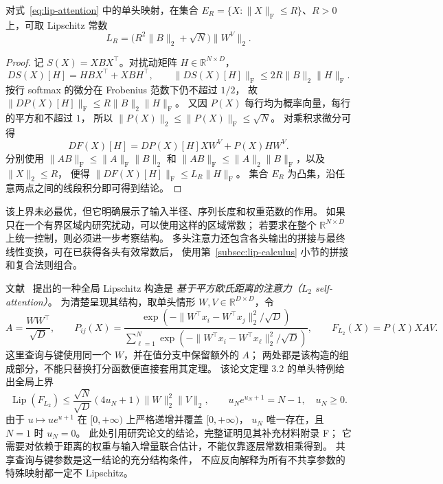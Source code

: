 \documentclass[UTF8,12pt,a4paper,fontset=fandol]{ctexart}
\begin{document}
\begin{proposition}\label{prop:lip-attention-bounded}
对式~\eqref{eq:lip-attention} 中的单头映射，在集合
$E_R=\{X:\|X\|_{\mathrm F}\le R\}$、$R>0$ 上，可取 Lipschitz 常数
\begin{equation}\label{eq:lip-attention-bounded}
  L_R=\bigl(R^2\|B\|_2+\sqrt N\bigr)\|W^V\|_2.
\end{equation}
\end{proposition}
\begin{proof}
记 $S(X)=XBX^\top$。对扰动矩阵 $H\in\mathbb R^{N\times D}$，
\[
  DS(X)[H]=HBX^\top+XBH^\top,\qquad
  \|DS(X)[H]\|_{\mathrm F}\le2R\|B\|_2\|H\|_{\mathrm F}.
\]
按行 softmax 的微分在 Frobenius 范数下仍不超过 $1/2$，
故 $\|DP(X)[H]\|_{\mathrm F}\le R\|B\|_2\|H\|_{\mathrm F}$。
又因 $P(X)$ 每行均为概率向量，每行的平方和不超过 $1$，
所以 $\|P(X)\|_2\le\|P(X)\|_{\mathrm F}\le\sqrt N$。
对乘积求微分可得
\[
  DF(X)[H]=DP(X)[H]XW^V+P(X)HW^V.
\]
分别使用 $\|AB\|_{\mathrm F}\le\|A\|_{\mathrm F}\|B\|_2$
和 $\|AB\|_{\mathrm F}\le\|A\|_2\|B\|_{\mathrm F}$，以及 $\|X\|_2\le R$，
便得 $\|DF(X)[H]\|_{\mathrm F}\le L_R\|H\|_{\mathrm F}$。
集合 $E_R$ 为凸集，沿任意两点之间的线段积分即可得到结论。
\end{proof}

该上界未必最优，但它明确展示了输入半径、序列长度和权重范数的作用。
如果只在一个有界区域内研究扰动，可以使用这样的区域常数；
若要求在整个 $\mathbb R^{N\times D}$ 上统一控制，则必须进一步考察结构。
多头注意力还包含各头输出的拼接与最终线性变换，可在已获得各头有效常数后，
使用第~\ref{subsec:lip-calculus} 小节的拼接和复合法则组合。

文献~\cite{kim-attention} 提出的一种全局 Lipschitz 构造是
\emph{基于平方欧氏距离的注意力（$L_2$ self-attention）}。
为清楚呈现其结构，取单头情形 $W,V\in\mathbb R^{D\times D}$，令
\begin{equation}\label{eq:lip-l2-attention}
  A=\frac{WW^\top}{\sqrt D},\qquad
  P_{ij}(X)=
  \frac{\exp\!\left(-\|W^\top x_i-W^\top x_j\|_2^2/\sqrt D\right)}
       {\sum_{\ell=1}^{N}
        \exp\!\left(-\|W^\top x_i-W^\top x_\ell\|_2^2/\sqrt D\right)},
  \qquad F_{L_2}(X)=P(X)XAV.
\end{equation}
这里查询与键使用同一个 $W$，并在值分支中保留额外的 $A$；
两处都是该构造的组成部分，不能只替换打分函数便直接套用其定理。
该论文定理 3.2 的单头特例给出全局上界
\begin{equation}\label{eq:lip-l2-bound}
  \operatorname{Lip}(F_{L_2})
  \le\frac{\sqrt N}{\sqrt D}(4u_N+1)\|W\|_2^2\|V\|_2,
  \qquad u_Ne^{u_N+1}=N-1,\quad u_N\ge0.
\end{equation}
由于 $u\mapsto ue^{u+1}$ 在 $[0,+\infty)$ 上严格递增并覆盖 $[0,+\infty)$，
$u_N$ 唯一存在，且 $N=1$ 时 $u_N=0$。
此处引用研究论文的结论，完整证明见其补充材料附录 F；
它需要对依赖于距离的权重与输入增量联合估计，不能仅靠逐层常数相乘得到。
共享查询与键参数是这一结论的充分结构条件，
不应反向解释为所有不共享参数的特殊映射都一定不 Lipschitz。
\end{document}
